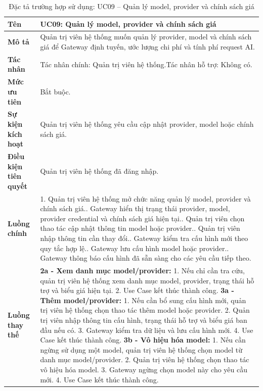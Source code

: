 \begin{longtable}{|L{4.2cm}|L{9.5cm}|}
\caption[Đặc tả UC09]{Đặc tả trường hợp sử dụng: UC09 -- Quản lý model, provider và chính sách giá} \\\hline
\textbf{Tên} & UC09: Quản lý model, provider và chính sách giá \\\hline
\textbf{Mô tả} & Quản trị viên hệ thống muốn quản lý provider, model và chính sách giá để Gateway định tuyến, ước lượng chi phí và tính phí request AI.\\\hline
\textbf{Tác nhân} & Tác nhân chính: Quản trị viên hệ thống.\newline Tác nhân hỗ trợ: Không có.\\\hline
\textbf{Mức ưu tiên} & Bắt buộc.\\\hline
\textbf{Sự kiện kích hoạt} & Quản trị viên hệ thống yêu cầu cập nhật provider, model hoặc chính sách giá.\\\hline
\textbf{Điều kiện tiên quyết} & Quản trị viên hệ thống đã đăng nhập.\\\hline
\textbf{Luồng chính} &
1. Quản trị viên hệ thống mở chức năng quản lý model, provider và chính sách giá.. Gateway hiển thị trạng thái provider, model, provider credential và chính sách giá hiện tại.. Quản trị viên chọn thao tác cập nhật thông tin model hoặc provider.. Quản trị viên nhập thông tin cần thay đổi.. Gateway kiểm tra cấu hình mới theo quy tắc hợp lệ.. Gateway lưu cấu hình model hoặc provider.. Gateway thông báo cấu hình đã sẵn sàng cho các yêu cầu tiếp theo.\\\hline
\textbf{Luồng thay thế} &
\textbf{2a - Xem danh mục model/provider:} 1. Nếu chỉ cần tra cứu, quản trị viên hệ thống xem danh mục model, provider, trạng thái hỗ trợ và biểu giá hiện tại. 2. Use Case kết thúc thành công.\newline
\textbf{3a - Thêm model/provider:} 1. Nếu cần bổ sung cấu hình mới, quản trị viên hệ thống chọn thao tác thêm model hoặc provider. 2. Quản trị viên nhập thông tin cấu hình, trạng thái hỗ trợ và biểu giá ban đầu nếu có. 3. Gateway kiểm tra dữ liệu và lưu cấu hình mới. 4. Use Case kết thúc thành công.\newline
\textbf{3b - Vô hiệu hóa model:} 1. Nếu cần ngừng sử dụng một model, quản trị viên hệ thống chọn model từ danh mục model/provider. 2. Quản trị viên hệ thống chọn thao tác vô hiệu hóa model. 3. Gateway ngừng chọn model này cho yêu cầu mới. 4. Use Case kết thúc thành công.\newline

\end{longtable}
